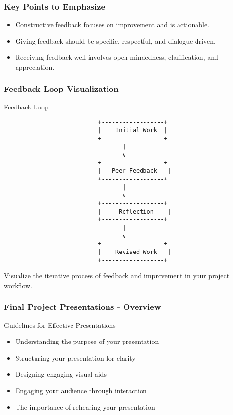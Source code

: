 \documentclass[aspectratio=169]{beamer}
\begin{document}
\begin{frame}[fragile]
    \frametitle{Key Points to Emphasize}
    \begin{itemize}
        \item Constructive feedback focuses on improvement and is actionable.
        \item Giving feedback should be specific, respectful, and dialogue-driven.
        \item Receiving feedback well involves open-mindedness, clarification, and appreciation.
    \end{itemize}
\end{frame}

\begin{frame}[fragile]
    \frametitle{Feedback Loop Visualization}
    \begin{block}{Feedback Loop}
    \begin{verbatim}
                           +------------------+
                           |    Initial Work  |
                           +------------------+
                                  |
                                  v
                           +------------------+
                           |   Peer Feedback   |
                           +------------------+
                                  |
                                  v
                           +------------------+
                           |     Reflection    |
                           +------------------+
                                  |
                                  v
                           +------------------+
                           |    Revised Work   |
                           +------------------+
    \end{verbatim}
    \end{block}
    
    Visualize the iterative process of feedback and improvement in your project workflow.
\end{frame}

\begin{frame}[fragile]
    \frametitle{Final Project Presentations - Overview}
    \begin{block}{Guidelines for Effective Presentations}
        \begin{itemize}
            \item Understanding the purpose of your presentation
            \item Structuring your presentation for clarity
            \item Designing engaging visual aids
            \item Engaging your audience through interaction
            \item The importance of rehearing your presentation
        \end{itemize}
    \end{block}
\end{frame}
\end{document}

